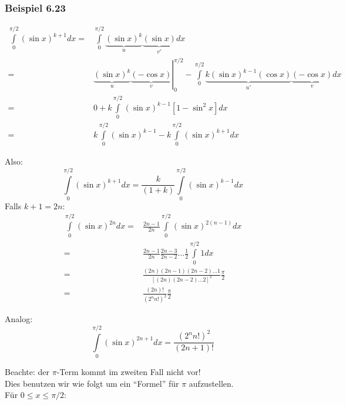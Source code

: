 \subsubsection*{Beispiel 6.23}

\begin{align*}
\int\limits_0^{\pi /2} {(\sin x)^{k + 1}dx} =&\int\limits_0^{\pi /2} {\underbrace {{{(\sin x)}^k}}_u\underbrace {(\sin x)}_{v'}dx}  \\
=&\left. {\underbrace {{{(\sin x)}^k}}_u\underbrace {( - \cos x)}_v} \right|_0^{\pi /2} - \int\limits_0^{\pi /2} {\underbrace {k{{(\sin x)}^{k - 1}}(\cos x)}_{u'}} \underbrace {( - \cos x)}_vdx\\
=&0 + k\int\limits_0^{\pi /2} {{{(\sin x)}^{k - 1}}} \left[ {1 - {{\sin }^2}x} \right]dx\\
 =&k\int\limits_0^{\pi /2} {{{(\sin x)}^{k - 1}} - k\int\limits_0^{\pi /2} {{{(\sin x)}^{k + 1}}} dx}
\end{align*}

Also:
\[\int\limits_0^{\pi /2} {{{(\sin x)}^{k + 1}}dx = \frac{k}{{(1 + k)}}\int\limits_0^{\pi /2} {{{(\sin x)}^{k - 1}}dx} } \]
Falls $k+1=2n$:
\begin{align*}
\int\limits_0^{\pi /2} {(\sin x)}^{2n}dx =&\frac{2n - 1}{2n}\int\limits_0^{\pi /2} {{(\sin x)}^{2(n - 1)}}dx\\
 =&\frac{{2n - 1}}{{2n}}\frac{{2n - 3}}{{2n - 2}} \ldots \frac{1}{2}\int\limits_0^{\pi /2} {1dx} \\
 =&\frac{{(2n)(2n - 1)(2n - 2) \ldots 1}}{{{{\left[ {(2n)(2n - 2) \ldots 2} \right]}^2}}}\frac{\pi }{2}\\
 =&\frac{{(2n)!}}{{{{({2^n}n!)}^2}}}\frac{\pi }{2}
\end{align*}

\noindent Analog:
\[\int\limits_0^{\pi /2} {{{(\sin x)}^{2n + 1}}dx = \frac{{{{({2^n}n!)}^2}}}{{(2n + 1)!}}} \]

\noindent Beachte: der $\pi$-Term kommt im zweiten Fall nicht vor!\\

\noindent Dies benutzen wir wie folgt um ein ``Formel'' für $\pi$ aufzustellen.\\

\noindent Für $0\leq x \leq\pi/2$:

